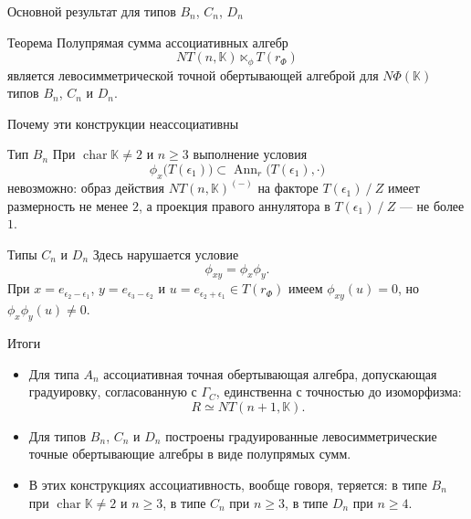 \documentclass[12pt,aspectratio=169]{beamer}
\DeclareMathOperator{\Ann}{Ann}
\DeclareMathOperator{\Char}{char}
\newcommand{\K}{\mathbb{K}}
\newcommand{\quot}[2]{#1\mathbin{/}#2}
\begin{document}
\begin{frame}[t]{Основной результат для типов $B_n$, $C_n$, $D_n$}
    \begin{alertblock}{Теорема}
        Полупрямая сумма ассоциативных алгебр
        \[
            NT(n,\K)\ltimes_\phi T(r_\Phi)
        \]
        является левосимметрической точной обертывающей алгеброй для $N\Phi(\K)$ типов
        $B_n$, $C_n$ и $D_n$.
    \end{alertblock}
\end{frame}

\begin{frame}[t]{Почему эти конструкции неассоциативны}
    \small
    \begin{block}{Тип $B_n$}
        При $\Char\K\neq 2$ и $n\ge 3$ выполнение условия
        \[
            \phi_x\bigl(T(\epsilon_1)\bigr)\subset \Ann_r\bigl(T(\epsilon_1),\cdot\bigr)
        \]
        невозможно: образ действия $NT(n,\mathbb{K})^{(-)}$ на факторе
        $\quot{T(\epsilon_1)}{Z}$ имеет размерность не менее $2$, а проекция правого
        аннулятора в $\quot{T(\epsilon_1)}{Z}$ --- не более $1$.
    \end{block}

    \begin{block}{Типы $C_n$ и $D_n$}
        Здесь нарушается условие \[\phi_{xy}=\phi_x\phi_y.\] При $x=e_{\epsilon_2 - \epsilon_1}$, $y=e_{\epsilon_3 - \epsilon_2}$ и
        $u=e_{\epsilon_2 + \epsilon_1}\in T(r_\Phi)$ имеем $\phi_{xy}(u)=0$, но $\phi_x\phi_y(u)\ne 0$.
    \end{block}
\end{frame}

\begin{frame}[t]{Итоги}
    \begin{itemize}
        \item Для типа $A_n$ ассоциативная точная обертывающая алгебра, допускающая
              градуировку, согласованную с $\Gamma_C$, единственна с точностью до
              изоморфизма:
              \[
                  R\simeq NT(n+1,\K).
              \]
        \item Для типов $B_n$, $C_n$ и $D_n$ построены градуированные левосимметрические
              точные обертывающие алгебры в виде полупрямых сумм.
        \item В этих конструкциях ассоциативность, вообще говоря, теряется: в типе $B_n$ при
              $\Char\K\neq 2$ и $n \geq 3$, в типе $C_n$ при $n\ge 3$, в типе $D_n$ при $n\ge
              4$.
    \end{itemize}
\end{frame}
\end{document}
